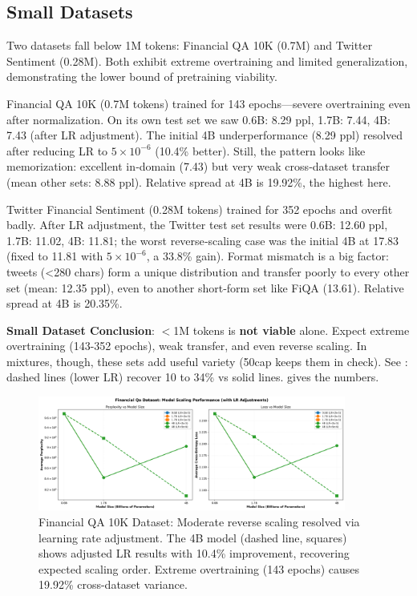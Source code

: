 





\subsection{Small Datasets}

Two datasets fall below 1M tokens: Financial QA 10K (0.7M) and Twitter Sentiment (0.28M). Both exhibit extreme overtraining and limited generalization, demonstrating the lower bound of pretraining viability.

Financial QA 10K (0.7M tokens) trained for 143 epochs—severe overtraining even after normalization. On its own test set we saw 0.6B: 8.29 ppl, 1.7B: 7.44, 4B: 7.43 (after LR adjustment). The initial 4B underperformance (8.29 ppl) resolved after reducing LR to $5\times10^{-6}$ (10.4\% better). Still, the pattern looks like memorization: excellent in‑domain (7.43) but very weak cross‑dataset transfer (mean other sets: 8.88 ppl). Relative spread at 4B is 19.92\%, the highest here.

Twitter Financial Sentiment (0.28M tokens) trained for 352 epochs and overfit badly. After LR adjustment, the Twitter test set results were 0.6B: 12.60 ppl, 1.7B: 11.02, 4B: 11.81; the worst reverse‑scaling case was the initial 4B at 17.83 (fixed to 11.81 with $5\times10^{-6}$, a 33.8\% gain). Format mismatch is a big factor: tweets (<280 chars) form a unique distribution and transfer poorly to every other set (mean: 12.35 ppl), even to another short‑form set like FiQA (13.61). Relative spread at 4B is 20.35\%.

\textbf{Small Dataset Conclusion}: $<$1M tokens is \textbf{not viable} alone. Expect extreme overtraining (143-352 epochs), weak transfer, and even reverse scaling. In mixtures, though, these sets add useful variety (50cap keeps them in check). See : dashed lines (lower LR) recover 10 to 34\% vs solid lines.  gives the numbers.

\begin{figure}[htbp]
\centering
\includegraphics[width=0.9\textwidth]{figures/scaling_financial_qa.png}
\caption[Financial QA 10K Dataset: Reverse Scaling]{Financial QA 10K Dataset: Moderate reverse scaling resolved via learning rate adjustment. The 4B model (dashed line, squares) shows adjusted LR results with 10.4\% improvement, recovering expected scaling order. Extreme overtraining (143 epochs) causes 19.92\% cross-dataset variance.}
\label{fig:scaling_financial_qa}
\end{figure}

